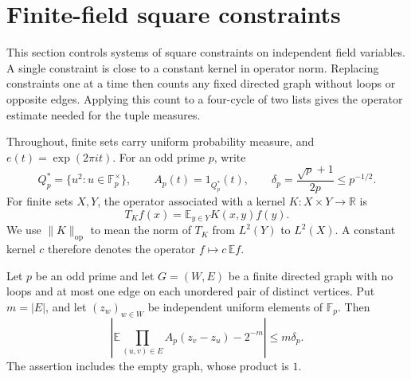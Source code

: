 \section{Finite-field square constraints}
\label{sec:finite-field-graphs}

This section controls systems of square constraints on independent field
variables.  A single constraint is close to a constant kernel in operator
norm.  Replacing constraints one at a time then counts any fixed directed
graph without loops or opposite edges.  Applying this count to a four-cycle
of two lists gives the operator estimate needed for the tuple measures.

Throughout, finite sets carry uniform probability measure, and
\(e(t)=\exp(2\pi i t)\).  For an odd prime \(p\), write
\[
 Q_p^*=\{u^2:u\in\mathbb F_p^\times\},
 \qquad
 A_p(t)=1_{Q_p^*}(t),
 \qquad
 \delta_p=\frac{\sqrt p+1}{2p}\le p^{-1/2}.
\]
For finite sets \(X,Y\), the operator associated with a kernel
\(K:X\times Y\to\mathbb R\) is
\[
 T_K f(x)=\mathbb E_{y\in Y}K(x,y)f(y).
\]
We use \(\|K\|_{\mathrm{op}}\) to mean the norm of \(T_K\) from
\(L^2(Y)\) to \(L^2(X)\).  A constant kernel \(c\) therefore denotes
the operator \(f\mapsto c\,\mathbb E f\).

\begin{lemma}
\label{lem:graph-count}
Let \(p\) be an odd prime and let \(G=(W,E)\) be a finite directed graph
with no loops and at most one edge on each unordered pair of distinct
vertices.  Put \(m=|E|\), and let \((z_w)_{w\in W}\) be independent
uniform elements of \(\mathbb F_p\).  Then
\[
 \left|
 \mathbb E\prod_{(u,v)\in E}A_p(z_v-z_u)-2^{-m}
 \right|
 \le m\delta_p.
\]
The assertion includes the empty graph, whose product is \(1\).
\end{lemma}

